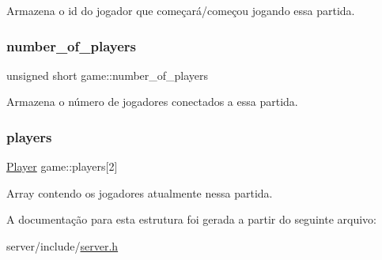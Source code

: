 Armazena o id do jogador que começará/começou jogando essa partida. \mbox{\label{structgame_a92e543c2bad8ce842e762eb639b7ae66}} 
\subsubsection{\texorpdfstring{number\+\_\+of\+\_\+players}{number\_of\_players}}
{\footnotesize\ttfamily unsigned short game\+::number\+\_\+of\+\_\+players}

Armazena o número de jogadores conectados a essa partida. \mbox{\label{structgame_a61d36a149f0d4d23b4ec8bff3a256d9f}} 
\subsubsection{\texorpdfstring{players}{players}}
{\footnotesize\ttfamily \hyperlink{server_8h_a9c8780378078e51e7c9041cbac392db9}{Player} game\+::players\mbox{[}2\mbox{]}}

Array contendo os jogadores atualmente nessa partida. 

A documentação para esta estrutura foi gerada a partir do seguinte arquivo\+:\begin{DoxyCompactItemize}
\item 
server/include/\hyperlink{server_8h}{server.\+h}\end{DoxyCompactItemize}
